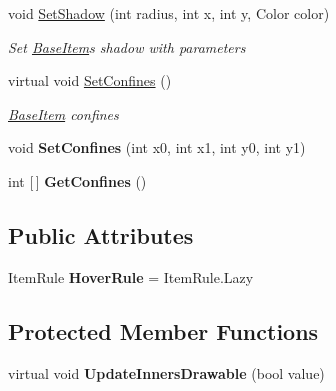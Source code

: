 \begin{DoxyCompactItemize}
void \mbox{\hyperlink{class_space_v_i_l_1_1_base_item_adaa4c47dddc52af32bf6bfba6bd85f9f}{Set\+Shadow}} (int radius, int x, int y, Color color)
\begin{DoxyCompactList}\small\item\em Set \mbox{\hyperlink{class_space_v_i_l_1_1_base_item}{Base\+Item}}\textquotesingle{}s shadow with parameters \end{DoxyCompactList}\item 
virtual void \mbox{\hyperlink{class_space_v_i_l_1_1_base_item_abb2566ee1b68d0e415d003fcb252ca70}{Set\+Confines}} ()
\begin{DoxyCompactList}\small\item\em \mbox{\hyperlink{class_space_v_i_l_1_1_base_item}{Base\+Item}} confines \end{DoxyCompactList}\item 
\mbox{\label{class_space_v_i_l_1_1_base_item_a8b0345fd4a7b73f7bf3310bd80861620}} 
void {\bfseries Set\+Confines} (int x0, int x1, int y0, int y1)
\item 
\mbox{\label{class_space_v_i_l_1_1_base_item_aa49650ca1911b9fa60e6a2ea9e8a3f34}} 
int \mbox{[}$\,$\mbox{]} {\bfseries Get\+Confines} ()
\end{DoxyCompactItemize}
\subsection*{Public Attributes}
\begin{DoxyCompactItemize}
\item 
\mbox{\label{class_space_v_i_l_1_1_base_item_accc863c17c2b80aa9170686b5a0d9f66}} 
Item\+Rule {\bfseries Hover\+Rule} = Item\+Rule.\+Lazy
\end{DoxyCompactItemize}
\subsection*{Protected Member Functions}
\begin{DoxyCompactItemize}
\item 
\mbox{\label{class_space_v_i_l_1_1_base_item_a6283f17a4100c1c334469b81f6b3c6d4}} 
virtual void {\bfseries Update\+Inners\+Drawable} (bool value)
\end{DoxyCompactItemize}


